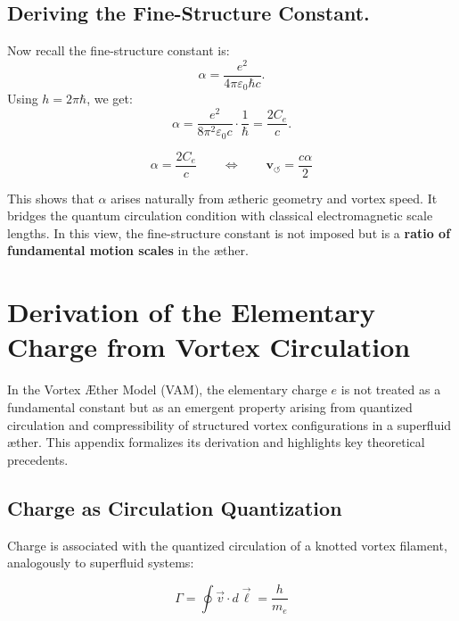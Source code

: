 \documentclass[12pt]{article}
\begin{document}
\subsection{Deriving the Fine-Structure Constant.}
Now recall the fine-structure constant is:
\begin{equation*}
    \alpha = \frac{e^2}{4 \pi \varepsilon_0 \hbar c}.
\end{equation*}
Using \( h = 2\pi \hbar \), we get:
\begin{equation*}
    \alpha = \frac{e^2}{8 \pi^2 \varepsilon_0 c} \cdot \frac{1}{\hbar} = \frac{2 C_e}{c}.
\end{equation*}

\begin{equation}
    \boxed{
        \alpha = \frac{2 C_e}{c}
    }
    \qquad \Leftrightarrow \qquad
    \boxed{
        \mathbf{v}_{\scriptscriptstyle\boldsymbol{\circlearrowleft}} = \frac{c \alpha}{2}
    }
\end{equation}

This shows that \( \alpha \) arises naturally from ætheric geometry and vortex speed. It bridges the quantum circulation condition with classical electromagnetic scale lengths. In this view, the fine-structure constant is not imposed but is a \textbf{ratio of fundamental motion scales} in the æther.
\section{Derivation of the Elementary Charge from Vortex Circulation}
\label{appendix:charge}

In the Vortex Æther Model (VAM), the elementary charge \( e \) is not treated as a fundamental constant but as an emergent property arising from quantized circulation and compressibility of structured vortex configurations in a superfluid æther. This appendix formalizes its derivation and highlights key theoretical precedents.

\subsection*{Charge as Circulation Quantization}

Charge is associated with the quantized circulation of a knotted vortex filament, analogously to superfluid systems:

\begin{equation}
    \Gamma = \oint \vec{v} \cdot d\vec{\ell} = \frac{h}{m_e}
\end{equation}
\end{document}
